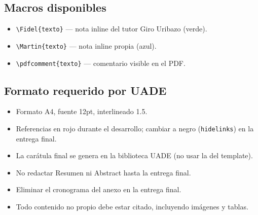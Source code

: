 \subsection*{Macros disponibles}
\begin{itemize}
    \item \texttt{\textbackslash Fidel\{texto\}} — nota inline del tutor Giro Uribazo (verde).
    \item \texttt{\textbackslash Martin\{texto\}} — nota inline propia (azul).
    \item \texttt{\textbackslash pdfcomment\{texto\}} — comentario visible en el PDF.
\end{itemize}

\subsection*{Formato requerido por UADE}
\begin{itemize}
    \item Formato A4, fuente 12pt, interlineado 1.5.
    \item Referencias en rojo durante el desarrollo; cambiar a negro (\texttt{hidelinks}) en la entrega final.
    \item La carátula final se genera en la biblioteca UADE (no usar la del template).
    \item No redactar Resumen ni Abstract hasta la entrega final.
    \item Eliminar el cronograma del anexo en la entrega final.
    \item Todo contenido no propio debe estar citado, incluyendo imágenes y tablas.
\end{itemize}

